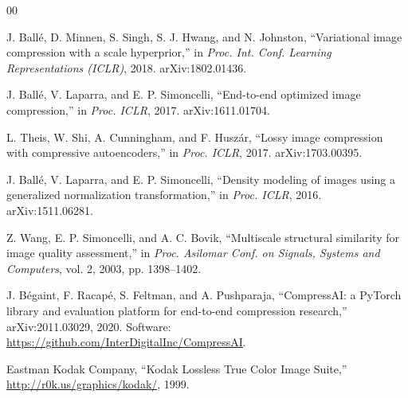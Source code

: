 \documentclass[review]{elsarticle}
\begin{document}
\begin{thebibliography}{00}

J. Ball\'e, D. Minnen, S. Singh, S. J. Hwang, and N. Johnston,
``Variational image compression with a scale hyperprior,''
in \textit{Proc. Int. Conf. Learning Representations (ICLR)}, 2018. arXiv:1802.01436.

J. Ball\'e, V. Laparra, and E. P. Simoncelli,
``End-to-end optimized image compression,''
in \textit{Proc. ICLR}, 2017. arXiv:1611.01704.

L. Theis, W. Shi, A. Cunningham, and F. Husz\'ar,
``Lossy image compression with compressive autoencoders,''
in \textit{Proc. ICLR}, 2017. arXiv:1703.00395.

J. Ball\'e, V. Laparra, and E. P. Simoncelli,
``Density modeling of images using a generalized normalization transformation,''
in \textit{Proc. ICLR}, 2016. arXiv:1511.06281.

Z. Wang, E. P. Simoncelli, and A. C. Bovik,
``Multiscale structural similarity for image quality assessment,''
in \textit{Proc. Asilomar Conf. on Signals, Systems and Computers}, vol. 2, 2003, pp. 1398--1402.

J. B\'egaint, F. Racap\'e, S. Feltman, and A. Pushparaja,
``CompressAI: a PyTorch library and evaluation platform for end-to-end compression research,''
arXiv:2011.03029, 2020.
Software: \url{https://github.com/InterDigitalInc/CompressAI}.

Eastman Kodak Company,
``Kodak Lossless True Color Image Suite,''
\url{http://r0k.us/graphics/kodak/}, 1999.

\end{thebibliography}
\end{document}
